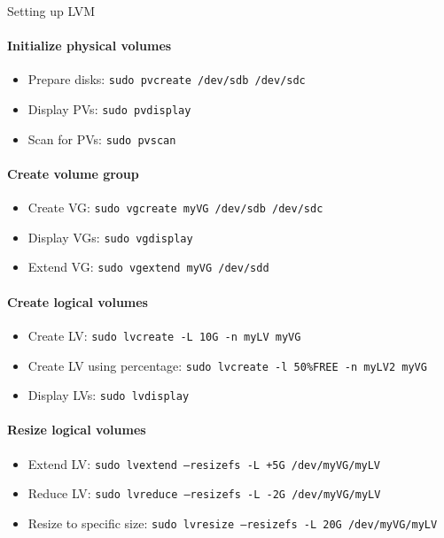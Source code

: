 \begin{KR}{Setting up LVM}\\
    \paragraph{Initialize physical volumes}
    \begin{itemize}
        \item Prepare disks: \texttt{sudo pvcreate /dev/sdb /dev/sdc}
        \item Display PVs: \texttt{sudo pvdisplay}
        \item Scan for PVs: \texttt{sudo pvscan}
    \end{itemize}
    
    \paragraph{Create volume group}
    \begin{itemize}
        \item Create VG: \texttt{sudo vgcreate myVG /dev/sdb /dev/sdc}
        \item Display VGs: \texttt{sudo vgdisplay}
        \item Extend VG: \texttt{sudo vgextend myVG /dev/sdd}
    \end{itemize}
    
    \paragraph{Create logical volumes}
    \begin{itemize}
        \item Create LV: \texttt{sudo lvcreate -L 10G -n myLV myVG}
        \item Create LV using percentage: \texttt{sudo lvcreate -l 50\%FREE -n myLV2 myVG}
        \item Display LVs: \texttt{sudo lvdisplay}
    \end{itemize}
    
    \paragraph{Resize logical volumes}
    \begin{itemize}
        \item Extend LV: \texttt{sudo lvextend --resizefs -L +5G /dev/myVG/myLV}
        \item Reduce LV: \texttt{sudo lvreduce --resizefs -L -2G /dev/myVG/myLV}
        \item Resize to specific size: \texttt{sudo lvresize --resizefs -L 20G /dev/myVG/myLV}
    \end{itemize}
    

\end{KR}
